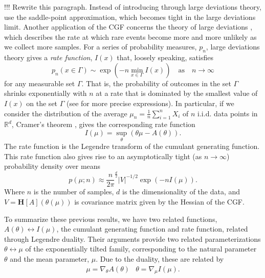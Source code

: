 \documentclass[11pt]{article}      %
\begin{document}
!!! Rewrite this paragraph. Instead of introducing through large deviations theory, use the saddle-point approximation, which becomes tight in the large deviations limit.
Another application of the CGF concerns the theory of large deviations \cite{dembo2009large}, which describes the rate at which rare events become more and more unlikely as we collect more samples. 
For a series of probability measures, $p_n$, large deviations theory gives a \textit{rate function}, $I(x)$ that, loosely speaking, satisfies
\begin{equation}
  p_n(x \in \Gamma) \sim \exp \left( - n \min_{x \in \Gamma} I(x) \right) \quad \textrm{as} \quad n \to \infty \label{def:large_deviations}
\end{equation}
for any measurable set $\Gamma$.
That is, the probability of outcomes in the set $\Gamma$ shrinks exponentially with $n$ at a rate that is dominated by the smallest value of $I(x)$ on the set $\Gamma$ (see \cite{dembo2009large} for more precise expressions).
In particular, if we consider the distribution of the average $\mu_n = \frac{1}{n} \sum_{i=1}^n X_i$ of $n$ i.i.d. data points in $\mathbb{R}^d$, Cramer's theorem \cite{dembo2009large}, gives the corresponding rate function
\begin{equation}
  I(\mu) = \sup_{\theta}( \theta \mu - A(\theta) ). \label{eq:legendre_transform}
\end{equation}
The rate function is the Legendre transform of the cumulant generating function.
This rate function also gives rise to an asymptotically tight (as $n \to \infty$) probability density over means \cite{iltis_sharp_1995,chaganty_multidimensional_1986}
\begin{equation}
  p(\mu; n) \approx \frac{n}{2\pi}^{\frac{d}{2}} |V|^{-1/2} \exp(-n I(\mu)). \label{def:mean_density}
\end{equation}
Where $n$ is the number of samples, $d$ is the dimensionality of the data, and $V = {\bm H}[A](\theta(\mu))$ is covariance matrix given by the Hessian of the CGF.


To summarize these previous results, we have two related functions, $A(\theta) \leftrightarrow I(\mu)$, the cumulant generating function and rate function, 
related through Legendre duality.
Their arguments provide two related parameterizations $\theta \leftrightarrow \mu$ of the exponentially tilted family, corresponding to the natural parameter $\theta$ and the mean parameter, $\mu$.
Due to the duality, these are related by 
\begin{eqnarray}
  \mu = \nabla_\theta A(\theta) & \theta = \nabla_\mu I(\mu). \label{eq:duality_relations}
\end{eqnarray}
\end{document}
